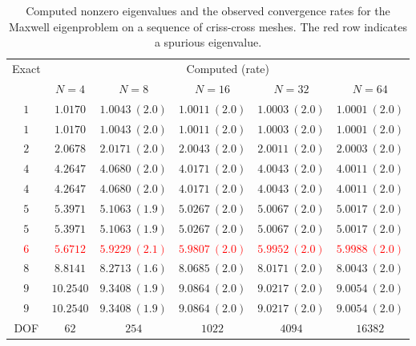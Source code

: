 \documentclass[12pt,a4paper]{article}
\theoremstyle{boldthm}
\theoremstyle{bolddefn}
\begin{document}
\begin{table}[ht]
\centering
\begin{tabular}{c|ccccc}
\toprule
\multicolumn{1}{c}{Exact}
&
\multicolumn{5}{c}{Computed (rate)}
\\
\cmidrule(lr){2-6}
&
$N=4$
&
$N=8$
&
$N=16$
&
$N=32$
&
$N=64$
\\
\midrule
$1$
&
$1.0170$
&
$1.0043\ (2.0)$
&
$1.0011\ (2.0)$
&
$1.0003\ (2.0)$
&
$1.0001\ (2.0)$
\\
$1$
&
$1.0170$
&
$1.0043\ (2.0)$
&
$1.0011\ (2.0)$
&
$1.0003\ (2.0)$
&
$1.0001\ (2.0)$
\\
$2$
&
$2.0678$
&
$2.0171\ (2.0)$
&
$2.0043\ (2.0)$
&
$2.0011\ (2.0)$
&
$2.0003\ (2.0)$
\\
$4$
&
$4.2647$
&
$4.0680\ (2.0)$
&
$4.0171\ (2.0)$
&
$4.0043\ (2.0)$
&
$4.0011\ (2.0)$
\\
$4$
&
$4.2647$
&
$4.0680\ (2.0)$
&
$4.0171\ (2.0)$
&
$4.0043\ (2.0)$
&
$4.0011\ (2.0)$
\\
$5$
&
$5.3971$
&
$5.1063\ (1.9)$
&
$5.0267\ (2.0)$
&
$5.0067\ (2.0)$
&
$5.0017\ (2.0)$
\\
$5$
&
$5.3971$
&
$5.1063\ (1.9)$
&
$5.0267\ (2.0)$
&
$5.0067\ (2.0)$
&
$5.0017\ (2.0)$
\\
\textcolor{red}{$6$}
&
\textcolor{red}{$5.6712$}
&
\textcolor{red}{$5.9229\ (2.1)$}
&
\textcolor{red}{$5.9807\ (2.0)$}
&
\textcolor{red}{$5.9952\ (2.0)$}
&
\textcolor{red}{$5.9988\ (2.0)$}
\\
$8$
&
$8.8141$
&
$8.2713\ (1.6)$
&
$8.0685\ (2.0)$
&
$8.0171\ (2.0)$
&
$8.0043\ (2.0)$
\\
$9$
&
$10.2540$
&
$9.3408\ (1.9)$
&
$9.0864\ (2.0)$
&
$9.0217\ (2.0)$
&
$9.0054\ (2.0)$
\\
$9$
&
$10.2540$
&
$9.3408\ (1.9)$
&
$9.0864\ (2.0)$
&
$9.0217\ (2.0)$
&
$9.0054\ (2.0)$
\\
\midrule
DOF
&
$62$
&
$254$
&
$1022$
&
$4094$
&
$16382$
\\
\bottomrule
\end{tabular}
\caption{Computed nonzero eigenvalues and the observed convergence rates for the Maxwell eigenproblem on a sequence of criss-cross meshes. The red row indicates a spurious eigenvalue.}
\label{spect pollute}
\end{table}
\end{document}

